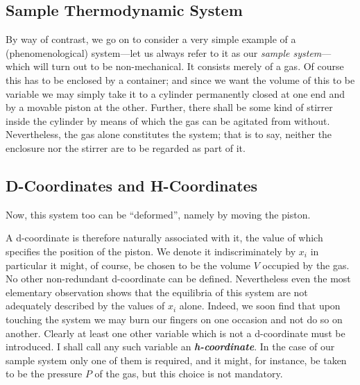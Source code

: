 \documentclass{article}
\theoremstyle{definition}
\begin{document}
\subsection{Sample Thermodynamic System}
By way of contrast, we go on to consider a very simple example of a (phenomenological) system—let us always refer to it as our \textit{sample system}—which will turn out to be non-mechanical. It consists merely of a gas. Of course this has to be enclosed by a container; and since we want the volume of this to be variable we may simply take it to a cylinder permanently closed at one end and by a movable piston at the other. Further, there shall be some kind of stirrer inside the cylinder by means of which the gas can be agitated from without. Nevertheless, the gas alone constitutes the system; that is to say, neither the enclosure nor the stirrer are to be regarded as part of it.

\subsection{D-Coordinates and H-Coordinates}
Now, this system too can be \enquote{deformed}, namely by moving the piston.
\\
\normalfont

A d-coordinate is therefore naturally associated with it, the value of which specifies the position of the piston. We denote it indiscriminately by \(x_i\) in particular it might, of course, be chosen to be the volume \(V\) occupied by the gas. No other non-redundant d-coordinate can be defined. Nevertheless even the most elementary observation shows that the equilibria of this system are not adequately described by the values of \(x_i\) alone. Indeed, we soon find that upon touching the system we may burn our fingers on one occasion and not do so on another. Clearly at least one other variable which is not a d-coordinate must be introduced. I shall call any such variable an \textbf{\textit{h-coordinate}}. In the case of our sample system only one of them is required, and it might, for instance, be taken to be the pressure \(P\) of the gas, but this choice is not mandatory.
\end{document}
